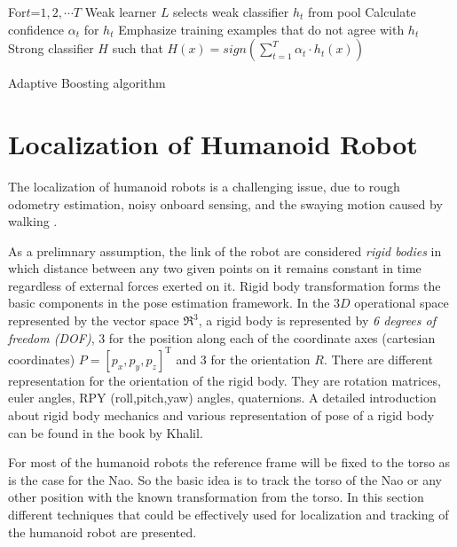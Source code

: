\begin{algorithm}[H]
 \label{alg:adaboost}
For{$t$=$1,2,\cdots T$}{
	Weak learner $L$ selects weak classifier $h_t$ from pool\;
	Calculate confidence $\alpha_t$ for $h_t$\;
	Emphasize training examples that do not agree with $h_t$\;
}
\Return Strong classifier $H$ such that $H(x)=sign(\sum_{t=1}^{T}\alpha_t\cdot h_t(x))$
 \caption{Adaptive Boosting algorithm}
\end{algorithm}

\section{Localization of Humanoid Robot} %

		The localization of humanoid robots is a challenging issue, due to rough odometry estimation, noisy onboard sensing, and the swaying motion caused by walking \cite{cervera2012localization}. 
		 
		As a prelimnary assumption, the link of the robot are considered \emph{rigid bodies} in which distance between any two given points on it remains constant in time regardless of external forces exerted on it. Rigid body transformation forms the basic components in the pose estimation framework. In the $3D$ operational space represented by the vector space $\Re^3$, a rigid body is represented by \emph{6 degrees of freedom (DOF)}, 3 for the position along each of the coordinate axes (cartesian coordinates) $P = [p_x,p_y,p_z]^{\text{T}}$ and 3 for the orientation $R$. There are different representation for the orientation of the rigid body. They are rotation matrices, euler angles, RPY (roll,pitch,yaw) angles, quaternions. A detailed introduction about rigid body mechanics and various representation of pose of a rigid body can be found in the book by Khalil\cite{khalil2004modeling}.
		
		For most of the humanoid robots the reference frame will be fixed to the torso as is the case for the Nao. So the basic idea is to track the torso of the Nao or any other position with the known transformation from the torso. In this section different techniques that could be effectively used for localization and tracking of the humanoid robot are presented.
